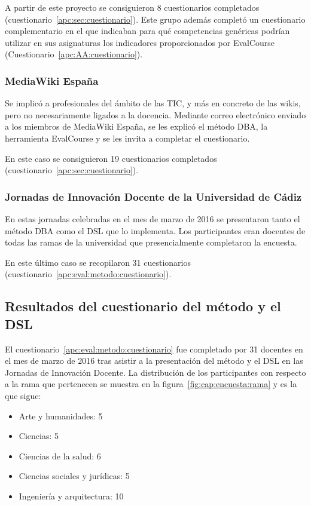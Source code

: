 A partir de este proyecto se consiguieron 8 cuestionarios completados (cuestionario~\ref{apc:sec:cuestionario}). Este grupo además completó un cuestionario complementario en el que indicaban para qué competencias genéricas podrían utilizar en sus asignaturas los indicadores proporcionados por EvalCourse (Cuestionario~\ref{apc:AA:cuestionario}).

	\subsubsection{MediaWiki España}

	Se implicó a profesionales del ámbito de las TIC, y más en concreto de las wikis, pero no necesariamente ligados a la docencia. Mediante correo electrónico enviado a los miembros de MediaWiki España, se les explicó el método DBA, la herramienta EvalCourse y se les invita a completar el cuestionario.		

En este caso se consiguieron 19 cuestionarios completados (cuestionario~\ref{apc:sec:cuestionario}).

	\subsubsection{Jornadas de Innovación Docente de la Universidad de Cádiz}

	En estas jornadas celebradas en el mes de marzo de 2016 se presentaron tanto el método DBA como el DSL que lo implementa. Los participantes eran docentes de todas las ramas de la universidad que presencialmente completaron la encuesta. 

En este último caso se recopilaron 31 cuestionarios (cuestionario~\ref{apc:eval:metodo:cuestionario}). 


\subsection{Resultados del cuestionario del método y el DSL}

El cuestionario~\ref{apc:eval:metodo:cuestionario} fue completado por 31 docentes en el mes de marzo de 2016 tras asistir a la presentación del método y el DSL en las Jornadas de Innovación Docente. La distribución de los participantes con respecto a la rama que pertenecen se muestra en la figura~\ref{fig:cap:encuesta:rama} y es la que sigue:

\begin{itemize}
\item Arte y humanidades: 5
\item Ciencias: 5
\item Ciencias de la salud: 6
\item Ciencias sociales y jurídicas: 5
\item Ingeniería y arquitectura: 10
\end{itemize}

